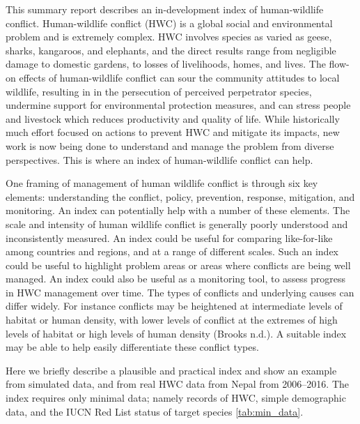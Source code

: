 \documentclass[fleqn,10pt]{olplainarticle}
\begin{document}
This summary report describes an in-development index of human-wildlife conflict.  Human-wildlife conflict (HWC) is a global social and environmental problem and is extremely complex. HWC involves species as varied as geese, sharks, kangaroos, and elephants, and the direct results range from negligible damage to domestic gardens, to losses of livelihoods, homes, and lives. The flow-on effects of human-wildlife conflict can sour the community attitudes to local wildlife, resulting in in the persecution of perceived perpetrator species, undermine support for environmental protection measures, and can stress people and livestock which reduces productivity and quality of life. While historically much effort focused on actions to prevent HWC and mitigate its impacts, new work is now being done to understand and manage the problem from diverse perspectives. This is where an index of human-wildlife conflict can help.

One framing of management of human wildlife conflict is through six key elements: understanding the conflict, policy, prevention, response, mitigation, and monitoring. An index can potentially help with a number of these elements. The scale and intensity of human wildlife conflict is generally poorly understood and inconsistently measured. An index could be useful for comparing like-for-like among countries and regions, and at a range of different scales. Such an index could be useful to highlight problem areas or areas where conflicts are being well managed. An index could also be useful as a monitoring tool, to assess progress in HWC management over time. The types of conflicts and underlying causes can differ widely. For instance conflicts may be heightened at intermediate levels of habitat or human density, with lower levels of conflict at the extremes of high levels of habitat or high levels of human density (Brooks n.d.). A suitable index may be able to help easily differentiate these conflict types. 

Here we briefly describe a plausible and practical index and show an example from simulated data, and from real HWC data from Nepal from 2006–2016. The index requires only minimal data; namely records of HWC, simple demographic data, and the IUCN Red List status of target species \ref{tab:min_data}.
\end{document}
